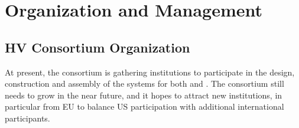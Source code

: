 \section{Organization and Management}
\label{sec:fddp-hv-org}

\subsection{HV Consortium Organization}
\label{sec:fddp-hv-org-consortium}

At present, the \hv consortium is gathering %
institutions to participate in the design, construction and assembly of the  systems for both  and . %
The consortium still needs to grow in the near future, and it hopes to attract new  institutions, in particular from EU to balance US participation with additional international participants.

